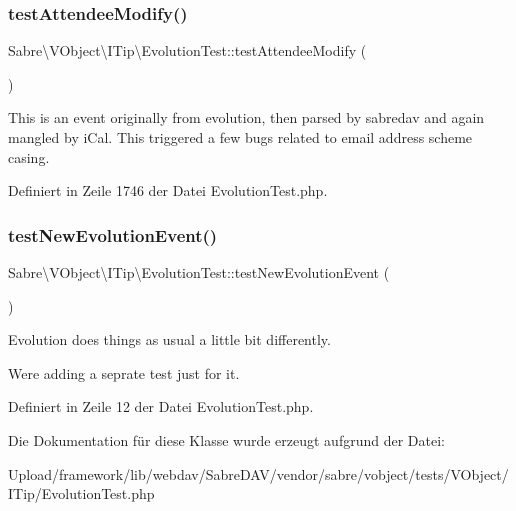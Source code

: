 \subsubsection{\texorpdfstring{test\+Attendee\+Modify()}{testAttendeeModify()}}
{\footnotesize\ttfamily Sabre\textbackslash{}\+V\+Object\textbackslash{}\+I\+Tip\textbackslash{}\+Evolution\+Test\+::test\+Attendee\+Modify (\begin{DoxyParamCaption}{ }\end{DoxyParamCaption})}

This is an event originally from evolution, then parsed by sabredav and again mangled by i\+Cal. This triggered a few bugs related to email address scheme casing. 

Definiert in Zeile 1746 der Datei Evolution\+Test.\+php.

\mbox{\label{class_sabre_1_1_v_object_1_1_i_tip_1_1_evolution_test_adfd5d39a116bdc8c16b4d62e28d443e4}} 
\subsubsection{\texorpdfstring{test\+New\+Evolution\+Event()}{testNewEvolutionEvent()}}
{\footnotesize\ttfamily Sabre\textbackslash{}\+V\+Object\textbackslash{}\+I\+Tip\textbackslash{}\+Evolution\+Test\+::test\+New\+Evolution\+Event (\begin{DoxyParamCaption}{ }\end{DoxyParamCaption})}

Evolution does things as usual a little bit differently.

We\textquotesingle{}re adding a seprate test just for it. 

Definiert in Zeile 12 der Datei Evolution\+Test.\+php.



Die Dokumentation für diese Klasse wurde erzeugt aufgrund der Datei\+:\begin{DoxyCompactItemize}
\item 
Upload/framework/lib/webdav/\+Sabre\+D\+A\+V/vendor/sabre/vobject/tests/\+V\+Object/\+I\+Tip/Evolution\+Test.\+php\end{DoxyCompactItemize}
